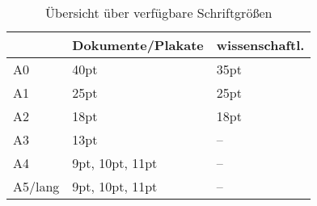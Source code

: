 






\begin{table}\centering
\begin{tabular}{lll}
      & Dokumente/Plakate & wissenschaftl.\\
\midrule
A0    & 40pt  & 35pt  \\
A1    & 25pt  & 25pt  \\
A2    & 18pt  & 18pt  \\
A3    & 13pt  & --    \\
A4    & 9pt, 10pt, 11pt & --\\
A5/lang & 9pt, 10pt, 11pt & --\\
\end{tabular}
\caption{Übersicht über verfügbare Schriftgrößen}
\end{table}
